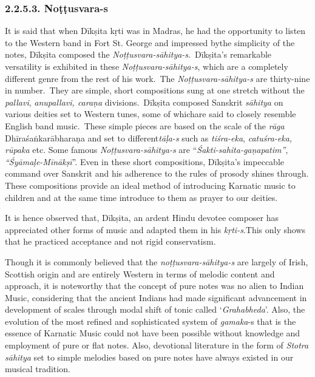 
\vspace{-.3cm}

\subsubsection*{2.2.5.3. Noṭṭusvara-s}

\vspace{-.2cm}

It is said that when Dīkṣita kṛti was in Madras, he had the opportunity to listen to the Western band in Fort St. George and impressed by\break the simplicity of the notes, Dīkṣita composed the \textit{Noṭṭusvara-\break sāhitya-s}.~Dīkṣita's remarkable versatility is exhibited in these \textit{Noṭṭu\-svara-sāhitya-s}, which are a completely different genre from the rest of his work.~The \textit{Noṭṭusvara-sāhitya-s} are thirty-nine in number.~They are simple, short compositions sung at one stretch without the \textit{pallavi}, \textit{anupallavi, caraṇa} divisions.~Dīkṣita composed Sanskrit \textit{sāhitya} on various deities set to Western tunes, some of whichare said to closely resemble English band music.~These simple pieces are based on the scale of the \textit{rāga} Dhīra\-śaṅkarābharaṇa and set to different\break \textit{tāḷa-s} such as \textit{tiśra-eka}, \textit{catuśra-eka, rūpaka} etc. Some famous \textit{Noṭṭusvara-\break sāhitya-s} are “\textit{Śakti-sahita-gaṇapatim”}, \textit{“Śyāmaḷe-Mīnākṣī}”. Even in these short compositions, Dīkṣita's impeccable command over Sanskrit and his adherence to the rules of prosody shines through. These compositions provide an ideal method of introducing Karnatic music to children and at the same time introduce to them as prayer to our deities.

It is hence observed that, Dīkṣita, an ardent Hindu devotee composer has appreciated other forms of music and adapted them in his \textit{kṛti-s}.\break This only shows that he practiced acceptance and not rigid conservatism.

Though it is commonly believed that the \textit{noṭṭusvara-sāhitya-s} are largely of Irish, Scottish origin and are entirely Western in terms of melodic content and approach, it is noteworthy that the concept of pure notes was no alien to Indian Music, considering that the ancient Indians had made significant advancement in development of scales through modal shift of tonic called ‘\textit{Grahabheda}’. Also, the evolution of the most refined and sophisticated system of \textit{gamaka}-s that is the essence of Karnatic Music could not have been possible without knowledge and employment of pure or flat notes. Also, devotional literature in the form of \textit{Stotra sāhitya} set to simple melodies based on pure notes have always existed in our musical tradition.

